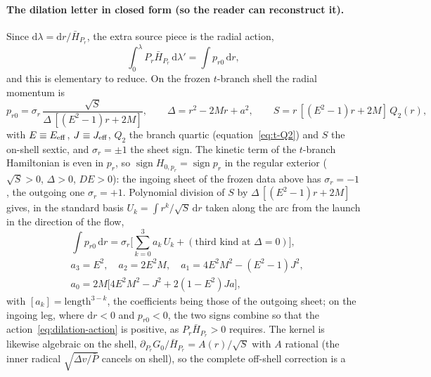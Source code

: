 \documentclass[12pt]{iopart}
\theoremstyle{plain}
\theoremstyle{definition}
\theoremstyle{remark}
\newcommand{\dd}{\mathrm{d}}
\begin{document}
\paragraph{The dilation letter in closed form (so the reader can reconstruct it).}
Since $\dd\lambda=\dd r/\bar H_{P_r}$, the extra source piece is the radial action,
\begin{equation}
    \int_0^{\lambda}P_r\bar H_{P_r}\,\dd\lambda'=\int p_{r0}\,\dd r,
    \label{eq:dilation-action}
\end{equation}
and this is elementary to reduce. On the frozen $t$-branch shell the radial momentum is
\begin{equation}
    p_{r0}=\sigma_r\,\frac{\sqrt{S}}{\Delta\,[(E^2-1)r+2M]},\qquad
    \Delta=r^2-2Mr+a^2,\qquad S=r\,[(E^2-1)r+2M]\,Q_2(r),
    \label{eq:pr0-tbranch}
\end{equation}
with $E\equiv E_{\rm eff}$, $J\equiv J_{\rm eff}$, $Q_2$ the branch quartic (equation~\eqref{eq:t-Q2})
and $S$ the on-shell sextic, and $\sigma_r=\pm1$ the sheet sign. The kinetic term of the
$t$-branch Hamiltonian is even in $p_r$, so $\operatorname{sign}H_{0,p_r}=\operatorname{sign}p_r$
in the regular exterior ($\sqrt S>0$, $\Delta>0$, $DE>0$): the ingoing sheet of the frozen
data above has $\sigma_r=-1$, the outgoing one $\sigma_r=+1$. Polynomial division of $S$ by
$\Delta\,[(E^2-1)r+2M]$ gives, in the standard basis $U_k=\int r^k/\sqrt S\,\dd r$ taken
along the arc from the launch in the direction of the flow,
\begin{equation}
    \int p_{r0}\,\dd r=\sigma_r\Big[\sum_{k=0}^{3}a_k\,U_k+(\text{third kind at }\Delta=0)\Big],
    \label{eq:action-reduction}
\end{equation}
\begin{equation}
    \begin{split}
    &a_3=E^2,\quad a_2=2E^2M,\quad a_1=4E^2M^2-(E^2-1)J^2,\\
    &a_0=2M\big[4E^2M^2-J^2+2(1-E^2)Ja\big],
    \end{split}
    \label{eq:ak}
\end{equation}
with $[a_k]=\text{length}^{3-k}$, the coefficients being those of the outgoing sheet;
on the ingoing leg, where $\dd r<0$ and $p_{r0}<0$, the two signs combine so that the
action~\eqref{eq:dilation-action} is positive, as $P_r\bar H_{P_r}>0$ requires. The kernel is likewise algebraic on the shell,
$\partial_{P_r}G_0/\bar H_{P_r}=A(r)/\sqrt S$ with $A$ rational (the inner radical
$\sqrt{\Delta v/\bar P}$ cancels on shell), so the complete off-shell correction is a
\end{document}
